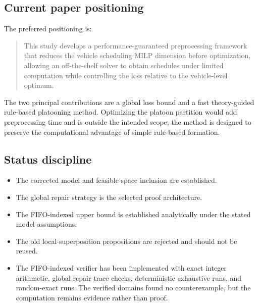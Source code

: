 \subsection*{Current paper positioning}

The preferred positioning is:

\begin{quote}
This study develops a performance-guaranteed preprocessing framework that reduces the vehicle scheduling MILP dimension before optimization, allowing an off-the-shelf solver to obtain schedules under limited computation while controlling the loss relative to the vehicle-level optimum.
\end{quote}

The two principal contributions are a global loss bound and a fast theory-guided rule-based platooning method. Optimizing the platoon partition would add preprocessing time and is outside the intended scope; the method is designed to preserve the computational advantage of simple rule-based formation.

\subsection*{Status discipline}

\begin{itemize}
  \item The corrected model and feasible-space inclusion are established.
  \item The global repair strategy is the selected proof architecture.
  \item The FIFO-indexed upper bound is established analytically under the stated model assumptions.
  \item The old local-superposition propositions are rejected and should not be reused.
  \item The FIFO-indexed verifier has been implemented with exact integer arithmetic, global repair trace checks, deterministic exhaustive runs, and random-exact runs. The verified domains found no counterexample, but the computation remains evidence rather than proof.
\end{itemize}
